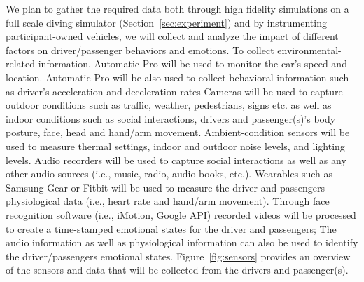 We plan to gather the required data both through high fidelity simulations on a full scale diving simulator (Section~\ref{sec:experiment}) and by instrumenting participant-owned vehicles, we will collect and analyze the impact of different factors on driver/passenger behaviors and emotions.
To collect environmental-related information, Automatic Pro will be used to monitor the car's speed and location. 
Automatic Pro will be also used to collect behavioral information such as driver's acceleration and deceleration rates
Cameras will be used to capture outdoor conditions such as traffic, weather, pedestrians, signs etc. as well as indoor conditions such as social interactions, drivers and passenger(s)'s body posture, face, head and hand/arm movement. 
Ambient-condition sensors will be used to measure thermal settings, indoor and outdoor noise levels, and lighting levels. 
Audio recorders will be used to capture social interactions as well as any other audio sources (i.e., music, radio, audio books, etc.). 
Wearables such as Samsung Gear or Fitbit will be used to measure the driver and passengers physiological data (i.e., heart rate and hand/arm movement). Through face recognition software (i.e., iMotion, Google API) recorded videos will be processed to create a time-stamped emotional states for the driver and passengers; 
The audio information as well as physiological information can also be used to identify the driver/passengers emotional states. 
Figure~\ref{fig:sensors} provides an overview of the sensors and data that will be collected from the drivers and passenger(s).   


